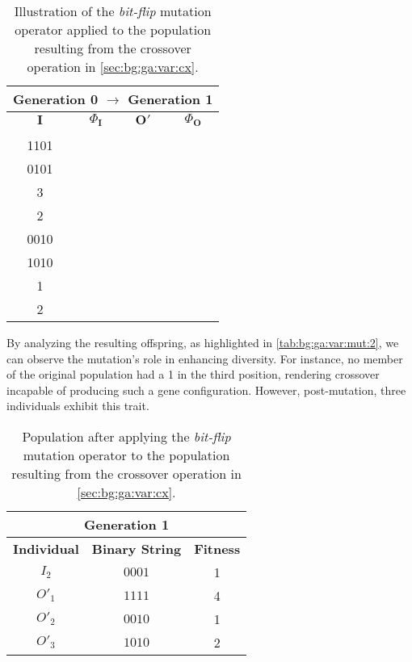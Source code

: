   
  \begin{table}[ht!]
    \centering
    \begin{tabular}{|c|c|c|c|}
      \multicolumn{4}{c}{\textbf{Generation 0} \(\to\) \textbf{Generation 1}} \\
      \hline
      \hline
      \(\mathbf{I}\) & \(\Phi_\mathbf{I}\) & \(\mathbf{O}'\) & \(\Phi_\mathbf{O}\) \\
      \hline
      \Gape[2pt][2pt]{\(\begin{bmatrix} 0000 \\ 1101 \\ 0101 \end{bmatrix}\)}
        & \(\begin{bmatrix} 0 \\ 3 \\ 2 \end{bmatrix}\)
        & \(\begin{bmatrix} 1111 \\ 0010 \\ 1010 \end{bmatrix}\) 
        & \(\begin{bmatrix} 4 \\ 1 \\ 2 \end{bmatrix}\) \\[1em]
      \hline
    \end{tabular}
    \caption{
      Illustration of the \emph{bit-flip} mutation operator applied to the 
      population resulting from the crossover operation in 
      \vref{sec:bg:ga:var:cx}.
    }
    \label{tab:bg:ga:var:cx:mutation}
  \end{table}

  By analyzing the resulting offspring, as highlighted in 
  \vref{tab:bg:ga:var:mut:2}, we can observe the mutation's role in enhancing 
  diversity.
  For instance, no member of the original population had a 1 in the third 
  position, rendering crossover incapable of producing such a gene 
  configuration.
  However, post-mutation, three individuals exhibit this trait.

  
  \begin{table}[ht!]
    \centering
    \begin{tabular}{c | c | c }
      \multicolumn{3}{c}{\textbf{Generation 1}} \\
      \hline
      \hline
      \textbf{Individual} & \textbf{Binary String}  & \textbf{Fitness} \\
      \hline
      \(I_2\)             & \(0001\)                & 1 \\
      \(O'_1\)            & \(1111\)                & 4 \\
      \(O'_2\)            & \(0010\)                & 1 \\
      \(O'_3\)            & \(1010\)                & 2
    \end{tabular}
    \caption{
      Population after applying the \emph{bit-flip} mutation operator to the 
      population resulting from the crossover operation in 
      \vref{sec:bg:ga:var:cx}.
    }
    \label{tab:bg:ga:var:mut:2}
  \end{table}

